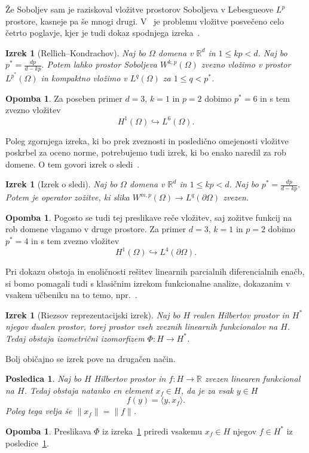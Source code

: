 \documentclass[12pt,a4paper,twoside]{article}
\theoremstyle{definition} %
\newtheorem{opomba}[definicija]{Opomba}
\theoremstyle{plain} %
\newtheorem{izrek}[definicija]{Izrek}
\newtheorem{posledica}[definicija]{Posledica}
\numberwithin{equation}{section}
\newcommand{\R}{\mathbb R}
\begin{document}
Že Soboljev sam je raziskoval vložitve prostorov Soboljeva v Lebesgueove $L^p$ prostore,
kasneje pa še mnogi drugi. V~\cite{adams2003sobolev} je problemu vložitve posvečeno celo četrto poglavje,
kjer je tudi dokaz spodnjega izreka~\cite[str.\ 85, izrek 4.12]{adams2003sobolev}.
\begin{izrek}[Rellich--Kondrachov]
  \label{izr:vlozitev-sobolj}
  Naj bo $\Omega$ domena v $\R^d$ in $1 \leq kp < d$.  Naj bo $p^\ast = \frac{dp}{d-kp}.$ Potem lahko
  prostor Soboljeva $W^{k,p}(\Omega)$ zvezno vložimo v prostor $L^{p^\ast}(\Omega)$ in kompaktno
  vložimo v $L^q(\Omega)$ za $1 \leq q < p^\ast$.
\end{izrek}
\begin{opomba}
  Za poseben primer $d=3$, $k=1$ in $p=2$ dobimo $p^\ast = 6$ in s tem zvezno vložitev
  \[
    H^1(\Omega) \hookrightarrow L^6(\Omega).
  \]
\end{opomba}
Poleg zgornjega izreka, ki bo prek zveznosti in posledično omejenosti vložitve poskrbel za oceno
norme, potrebujemo tudi izrek, ki bo enako naredil za rob domene. O tem govori izrek o
sledi~\cite[str.\ 164, izrek 5.36]{adams2003sobolev}.
\begin{izrek}[Izrek o sledi]
  \label{izr:soboljev-sled}
  Naj bo $\Omega$ domena v $\R^d$ in $1 \leq kp < d$. Naj bo $p^\ast = \frac{dp}{d-kp}.$  Potem
  je operator zožitve, ki slika $W^{m,p}(\Omega) \to L^q(\partial \Omega)$ zvezen.
\end{izrek}
\begin{opomba}
  Pogosto se tudi tej preslikave reče vložitev, saj zožitve funkcij na rob domene vlagamo v druge
  prostore. Za primer $d=3$, $k=1$ in $p=2$ dobimo $p^\ast = 4$ in s tem zvezno vložitev
  \[
    H^1(\Omega) \hookrightarrow L^4(\partial\Omega).
  \]
\end{opomba}

Pri dokazu obstoja in enoličnosti rešitev linearnih parcialnih diferencialnih enačb, si bomo
pomagali tudi s klasičnim izrekom funkcionalne analize, dokazanim v vsakem učbeniku na to temo,
npr.~\cite[str.\ 188, izrek 3.8-1]{kreyszig1989introductory}.
\begin{izrek}[Riezsov reprezentacijski izrek]
  \label{izr:riesz-general}
  Naj bo $H$ realen Hilbertov prostor in $H^\ast$ njegov dualen prostor, torej
  prostor vseh zveznih linearnih funkcionalov na $H$. Tedaj obstaja izometrični
  izomorfizem $\Phi\colon H\to H^\ast$.
\end{izrek}
Bolj običajno se izrek pove na drugačen način.
\begin{posledica}
  \label{izr:riesz-useful}
  Naj bo $H$ Hilbertov prostor in $f\colon H\to\R$ zvezen linearen funkcional na $H$.
  Tedaj obstaja natanko en element $x_f \in H$, da je za vsak $y \in H$
  \[ f(y) = \langle y, x_f \rangle. \]
  Poleg tega velja še $\|x_f\| = \|f\|$.
\end{posledica}
\begin{opomba}
  Preslikava $\Phi$ iz izreka~\ref{izr:riesz-general} priredi vsakemu $x_f \in
  H$ njegov $f \in H^\ast$ iz posledice~\ref{izr:riesz-useful}.
\end{opomba}
\end{document}
